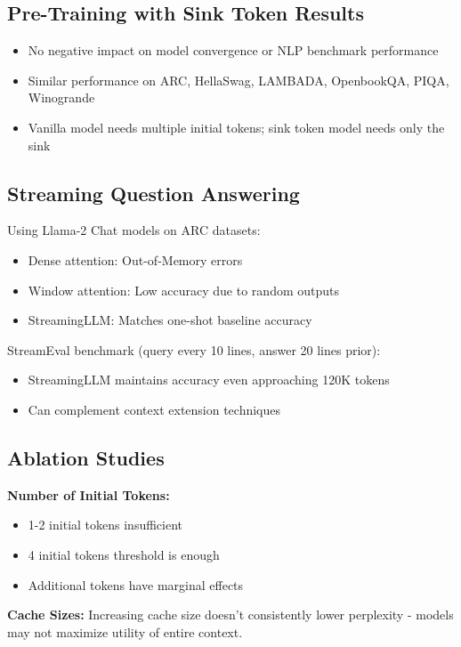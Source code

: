 \subsection{Pre-Training with Sink Token Results}
\begin{itemize}
\item No negative impact on model convergence or NLP benchmark performance
\item Similar performance on ARC, HellaSwag, LAMBADA, OpenbookQA, PIQA, Winogrande
\item Vanilla model needs multiple initial tokens; sink token model needs only the sink
\end{itemize}

\subsection{Streaming Question Answering}
Using Llama-2 Chat models on ARC datasets:
\begin{itemize}
\item Dense attention: Out-of-Memory errors
\item Window attention: Low accuracy due to random outputs
\item StreamingLLM: Matches one-shot baseline accuracy
\end{itemize}

StreamEval benchmark (query every 10 lines, answer 20 lines prior):
\begin{itemize}
\item StreamingLLM maintains accuracy even approaching 120K tokens
\item Can complement context extension techniques
\end{itemize}

\subsection{Ablation Studies}
\textbf{Number of Initial Tokens:}
\begin{itemize}
\item 1-2 initial tokens insufficient
\item 4 initial tokens threshold is enough
\item Additional tokens have marginal effects
\end{itemize}

\textbf{Cache Sizes:} Increasing cache size doesn't consistently lower perplexity - models may not maximize utility of entire context.

